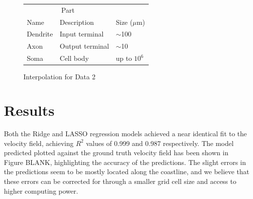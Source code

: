 \documentclass{article}
\begin{document}
\begin{figure}[!htb]
\begin{minipage}{0.33\textwidth}
\begin{table}
\begin{tabular}{lll}
        \multicolumn{2}{c}{Part}                   \\
        \cmidrule(r){1-2}
        Name     & Description     & Size ($\mu$m) \\
        \midrule
        Dendrite & Input terminal  & $\sim$100     \\
        Axon     & Output terminal & $\sim$10      \\
        Soma     & Cell body       & up to $10^6$  \\
        \bottomrule
      \end{tabular}
    \end{table}
     \caption{Interpolation for Data 2}\label{Fig:Data2}
   \end{minipage}
\end{figure}



\section{Results}

Both the Ridge and LASSO regression models achieved a near identical fit to the velocity field, achieving $R^{2}$ values of 0.999 and 0.987 respectively. The model predicted plotted against the ground truth velocity field has been shown in Figure BLANK, highlighting the accuracy of the predictions. The slight errors in the predictions seem to be mostly located along the coastline, and we believe that these errors can be corrected for through a smaller grid cell size and access to higher computing power. 
\end{document}
